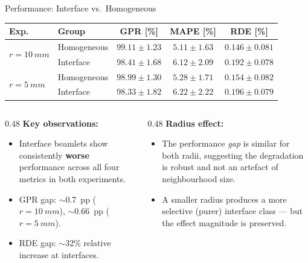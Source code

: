 \documentclass[aspectratio=169, 10pt]{beamer}
\begin{document}
\begin{frame}{Performance: Interface vs.\ Homogeneous}
  \begin{table}
    \centering\small
    \begin{tabular}{llccc}
      \toprule
      \textbf{Exp.} & \textbf{Group} & \textbf{GPR [\%]} & \textbf{MAPE [\%]}
        & \textbf{RDE [\%]} \\
      \midrule
      \multirow{2}{*}{$r{=}\SI{10}{mm}$}
        & Homogeneous & $99.11 \pm 1.23$ & $5.11 \pm 1.63$ & $0.146 \pm 0.081$  \\
        & Interface   & $98.41 \pm 1.68$ & $6.12 \pm 2.09$ & $0.192 \pm 0.078$  \\
      \midrule
      \multirow{2}{*}{$r{=}\SI{5}{mm}$}
        & Homogeneous & $98.99 \pm 1.30$ & $5.28 \pm 1.71$ & $0.154 \pm 0.082$ \\
        & Interface   & $98.33 \pm 1.82$ & $6.22 \pm 2.22$ & $0.196 \pm 0.079$  \\
      \bottomrule
    \end{tabular}
  \end{table}

  \vspace{6pt}
  \begin{columns}[T]
    \begin{column}{0.48\textwidth}
      \textbf{Key observations:}
      \begin{itemize}
        \item Interface beamlets show consistently \textbf{worse} performance
              across all four metrics in both experiments.
        \item GPR gap: $\sim$\SI{0.7}{pp} ($r{=}\SI{10}{mm}$),
              $\sim$\SI{0.66}{pp} ($r{=}\SI{5}{mm}$).
        \item RDE gap: $\sim$32\% relative increase at interfaces.
      \end{itemize}
    \end{column}
    \begin{column}{0.48\textwidth}
      \textbf{Radius effect:}
      \begin{itemize}
        \item The performance \emph{gap} is similar for both radii,
              suggesting the degradation is robust and not an artefact
              of neighbourhood size.
        \item A smaller radius produces a more selective (purer) interface
              class — but the effect magnitude is preserved.
      \end{itemize}
    \end{column}
  \end{columns}
\end{frame}
\end{document}
